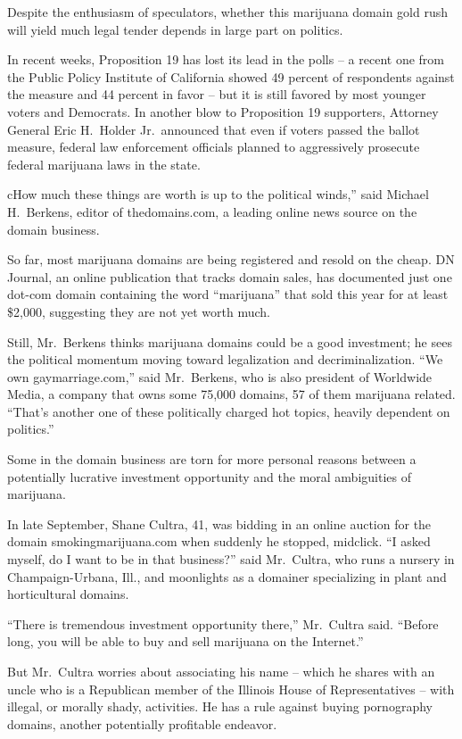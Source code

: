 ﻿\documentclass[12pt]{article}
\begin{document}
Despite the enthusiasm of speculators, whether this marijuana domain gold rush will yield much legal
tender depends in large part on politics.

In recent weeks, Proposition 19 has lost its lead in the polls -- a recent one from the Public
Policy Institute of California showed 49 percent of respondents against the measure and 44 percent
in favor -- but it is still favored by most younger voters and Democrats. In another blow to
Proposition 19 supporters, Attorney General Eric H.~Holder Jr.~announced that even if voters passed
the ballot measure, federal law enforcement officials planned to aggressively prosecute federal
marijuana laws in the state.

cHow much these things are worth is up to the political winds,'' said Michael H.~Berkens, editor of
thedomains.com, a leading online news source on the domain business.

So far, most marijuana domains are being registered and resold on the cheap. DN Journal, an online
publication that tracks domain sales, has documented just one dot-com domain containing the word
``marijuana'' that sold this year for at least \$2,000, suggesting they are not yet worth much.

Still, Mr.~Berkens thinks marijuana domains could be a good investment; he sees the political
momentum moving toward legalization and decriminalization. ``We own gaymarriage.com,'' said
Mr.~Berkens, who is also president of Worldwide Media, a company that owns some 75,000 domains, 57
of them marijuana related. ``That's another one of these politically charged hot topics, heavily
dependent on politics.''

Some in the domain business are torn for more personal reasons between a potentially lucrative
investment opportunity and the moral ambiguities of marijuana.

In late September, Shane Cultra, 41, was bidding in an online auction for the domain
smokingmarijuana.com when suddenly he stopped, midclick. ``I asked myself, do I want to be in that
business?'' said Mr.~Cultra, who runs a nursery in Champaign-Urbana, Ill., and moonlights as a
domainer specializing in plant and horticultural domains.

``There is tremendous investment opportunity there,'' Mr.~Cultra said. ``Before long, you will be
able to buy and sell marijuana on the Internet.''

But Mr.~Cultra worries about associating his name -- which he shares with an uncle who is a
Republican member of the Illinois House of Representatives -- with illegal, or morally shady,
activities. He has a rule against buying pornography domains, another potentially profitable
endeavor.
\end{document}
